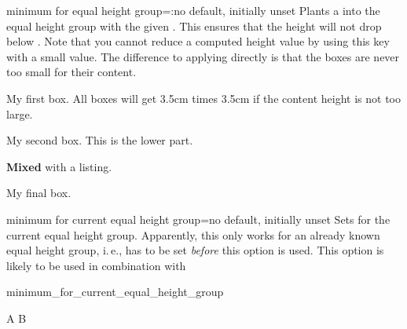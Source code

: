 \clearpage
\begin{docTcbKey}{minimum for equal height group}{=:}{no default, initially unset}
  Plants a  into the equal height group with
  the given . This ensures that the height will not drop below
  . Note that you cannot reduce a computed height value
  by using this key with a small value.
  The difference to applying  directly is that the boxes
  are never too small for their content.

\begin{dispExample}

\begin{tcolorbox}
  My first box. All boxes will get 3.5cm times 3.5cm
  if the content height is not too large.
\end{tcolorbox}%
\begin{tcolorbox}
  My second box.
  \tcblower
  This is the lower part.
\end{tcolorbox}%
\begin{tcblisting}{}
\textbf{Mixed}
with a listing.
\end{tcblisting}
\begin{tcolorbox}[title={Fourth box}]
  My final box.
\end{tcolorbox}%
\end{dispExample}
\end{docTcbKey}


\begin{docTcbKey}[][doc new=2016-03-24]{minimum for current equal height group}{=}{no default, initially unset}
  Sets  for the current equal height
  group. Apparently, this only works for an already known equal height group, i.\,e.,
   has to be set \emph{before} this option is used.
  This option is likely to be used in combination with 

\begin{exdispExample}[runs=2]{minimum_for_current_equal_height_group}
\begin{tcbitemize}[raster equal height,colframe=blue!75!black,colback=white,
  raster every box/.style={minimum for current equal height group=2cm}]
  \tcbitem A
  \tcbitem B
\end{tcbitemize}
\end{exdispExample}

\end{docTcbKey}


